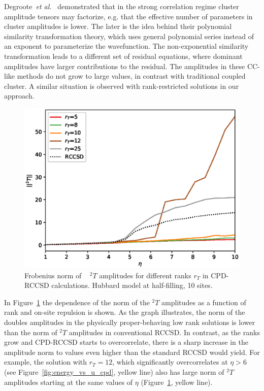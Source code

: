 Degroote~\emph{et al.}~\cite{degroote2016polynomial} demonstrated
that in the strong correlation regime cluster amplitude tensors may factorize, 
e.g. that the effective number of parameters in cluster amplitudes is lower. 
The later is the idea behind their polynomial similarity transformation theory, 
which uses general polynomial series instead of an exponent to parameterize 
the wavefunction. The non-exponential similarity transformation leads to a 
different set of residual equations, where dominant amplitudes have larger 
contributions to the residual. The amplitudes in these CC-like methods do not 
grow to large values, in contrast with traditional coupled cluster.
A similar situation is observed with rank-restricted solutions in our approach.

%
\begin{figure}[ht]
\includegraphics[width=\columnwidth]
{figures/tcc_strong_correlation/t2_norms_vs_u_10_sites_cpd_rccsd}
\caption{Frobenius norm of ~ ${}^2T$ amplitudes for different ranks $r_{T}$ in 
CPD-RCCSD 
calculations. Hubbard model at half-filling, 10 sites.
\label{fig:t2_norms_vs_u_10_sites_cpd_rccsd}}
\end{figure}
%
In Figure~\ref{fig:t2_norms_vs_u_10_sites_cpd_rccsd} the dependence of the norm 
of the ${}^2T$ amplitudes as a function of rank and on-site repulsion is shown. 
As the graph illustrates, the norm of the doubles amplitudes in the physically 
proper-behaving low rank solutions is lower than the norm of ${}^2T$ amplitudes 
in conventional RCCSD. In contrast, as the ranks grow and CPD-RCCSD starts 
to overcorrelate, there is a sharp increase in the amplitude norm to values 
even higher than the standard RCCSD would yield. For example, the solution with 
$r_{T} = 12$, which significantly overcorrelates at $\eta > 6$ (see 
Figure~\ref{fig:energy_vs_u_cpd}, yellow line) also has large 
norm of ${}^2T$ amplitudes starting at the same values of $\eta$ 
(Figure~\ref{fig:t2_norms_vs_u_10_sites_cpd_rccsd}, yellow line). 

